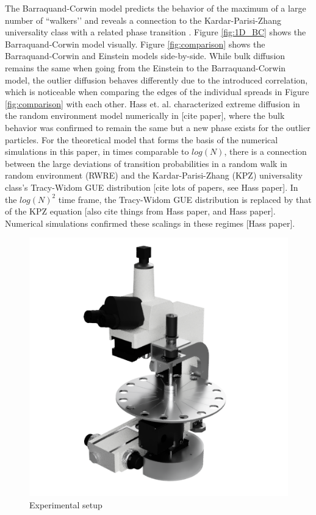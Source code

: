The Barraquand-Corwin model predicts the behavior of the maximum of a large number of ``walkers’’ and reveals a connection to the Kardar-Parisi-Zhang universality class with a related phase transition \cite{barraquand_random-walk_2017, barraquand_moderate_2020, le_doussal_diffusion_2017, kardar_dynamic_1986}. Figure \ref{fig:1D_BC} shows the Barraquand-Corwin model visually. Figure \ref{fig:comparison} shows the Barraquand-Corwin and Einstein models side-by-side. While bulk diffusion remains the same when going from the Einstein to the Barraquand-Corwin model, the outlier diffusion behaves differently due to the introduced correlation, which is noticeable when comparing the edges of the individual spreads in Figure \ref{fig:comparison} with each other. Hass et. al. characterized extreme diffusion in the random environment model numerically in [cite paper], where the bulk behavior was confirmed to remain the same but a new phase exists for the outlier particles. For the theoretical model that forms the basis of the numerical simulations in this paper, in times comparable to $log\left(N\right)$, there is a connection between the large deviations of transition probabilities in a random walk in random environment (RWRE) and the Kardar-Parisi-Zhang (KPZ) universality class's Tracy-Widom GUE distribution [cite lots of papers, see Hass paper]. In  the $log\left(N\right)^{2}$ time frame, the Tracy-Widom GUE distribution is replaced by that of the KPZ equation [also cite things from Hass paper, and Hass paper]. Numerical simulations confirmed these scalings in these regimes [Hass paper].
%

\begin{figure}[htp]
\begin{center}
\includegraphics[width=0.9\columnwidth]{Figures/microscope_centrifuge_1.png}
\caption{\label{fig:CADrender} Experimental setup}
\end{center}
\end{figure}


